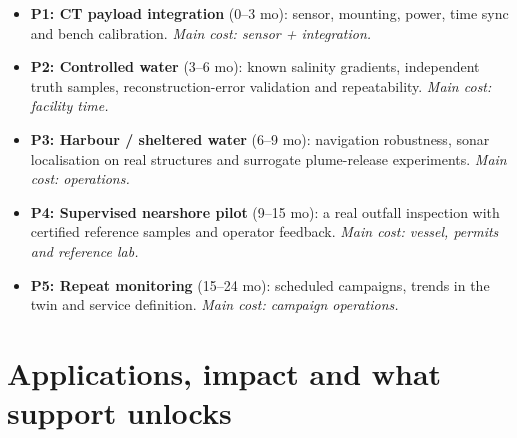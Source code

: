 \documentclass[10pt,a4paper]{article}
\newcommand{\keyword}[1]{\textbf{\color{deepblue}#1}}
\begin{document}
\vspace{-2pt}
\begin{itemize}\small
  \item \keyword{P1: CT payload integration} (0--3 mo): sensor, mounting, power, time sync and bench calibration. \emph{Main cost: sensor + integration.}
  \item \keyword{P2: Controlled water} (3--6 mo): known salinity gradients, independent truth samples, reconstruction-error validation and repeatability. \emph{Main cost: facility time.}
  \item \keyword{P3: Harbour / sheltered water} (6--9 mo): navigation robustness, sonar localisation on real structures and surrogate plume-release experiments. \emph{Main cost: operations.}
  \item \keyword{P4: Supervised nearshore pilot} (9--15 mo): a real outfall inspection with certified reference samples and operator feedback. \emph{Main cost: vessel, permits and reference lab.}
  \item \keyword{P5: Repeat monitoring} (15--24 mo): scheduled campaigns, trends in the twin and service definition. \emph{Main cost: campaign operations.}
\end{itemize}

\section{Applications, impact and what support unlocks}
\end{document}
